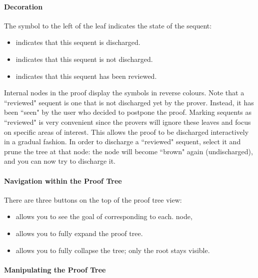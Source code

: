 \paragraph{Decoration}
The symbol to the left of the leaf indicates the state of the sequent:
\begin{itemize}
	\item {} indicates that this sequent is discharged.
	\item {} indicates that this sequent is not discharged.
	\item {} indicates that this sequent has been reviewed. 
\end{itemize}

Internal nodes in the proof display the symbols in reverse colours. Note that a ``reviewed" sequent is one that is not discharged yet by the prover. Instead, it has been ``seen" by the user who decided to postpone the proof. Marking sequents as ``reviewed" is very convenient since the provers will ignore these leaves and focus on specific areas of interest. This allows the proof to be discharged interactively in a gradual fashion. In order to discharge a ``reviewed" sequent, select it and prune the tree at that node: the node will become ``brown" again (undischarged), and you can now try to discharge it. 

\paragraph{Navigation within the Proof Tree}

There are three buttons on the top of the proof tree view:

\begin{itemize}
	\item {} allows you to see the goal of corresponding to each. node,
	\item {} allows you to fully expand the proof tree.
	\item {} allows you to fully collapse the tree; only the root stays visible. 
\end{itemize}

\paragraph{Manipulating the Proof Tree}

